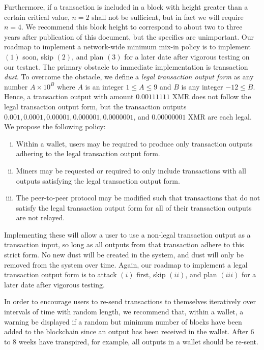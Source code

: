 \documentclass[12pt,english]{mrl}
\theoremstyle{definition}
\renewcommand{\leq}{\leqslant}
\numberwithin{equation}{section}
\numberwithin{figure}{section}
\numberwithin{equation}{section}
\numberwithin{equation}{section}
\numberwithin{figure}{section}
\begin{document}
Furthermore, if a transaction is included in a block with height greater than a certain critical value, $n=2$ shall not be sufficient, but in fact we will require $n=4$. We recommend this block height to correspond to about two to three years after publication of this document, but the specifics are unimportant.  Our roadmap to implement a network-wide minimum mix-in policy is to implement $(1)$ soon, skip $(2)$, and plan $(3)$ for a later date after vigorous testing on our testnet. The primary obstacle to immediate implementation is transaction \textit{dust}. To overcome the obstacle, we define a \textit{legal transaction output form} as any number $A \times 10^{B}$ where $A$ is an integer $1 \leq A \leq 9$ and $B$ is any integer $-12 \leq B$. Hence, a transaction output with amount $0.00111111$ XMR does not follow the legal transaction output form, but the transaction outputs $0.001, 0.0001, 0.00001, 0.000001, 0.0000001$, and $0.00000001$ XMR are each legal. We propose the following policy:

\begin{enumerate}[(i)]
\item Within a wallet, users may be required to produce only transaction outputs adhering to the legal transaction output form.
\item Miners may be requested or required to only include transactions with all outputs satisfying the legal transaction output form.
\item The peer-to-peer protocol may be modified such that transactions that do not satisfy the legal transaction output form for all of their transaction outputs are not relayed.
\end{enumerate}

Implementing these will allow a user to use a non-legal transaction output as a transaction input, so long as all outputs from that transaction adhere to this strict form. No new dust will be created in the system, and dust will only be removed from the system over time. Again, our roadmap to implement a legal transaction output form is to attack $(i)$ first, skip $(ii)$, and plan $(iii)$ for a later date after vigorous testing. 

In order to encourage users to re-send transactions to themselves iteratively over intervals of time with random length, we recommend that, within a wallet, a warning be displayed if a random but minimum number of blocks have been added to the blockchain since an output has been received in the wallet. After $6$ to $8$ weeks have transpired, for example, all outputs in a wallet should be re-sent.
\end{document}
